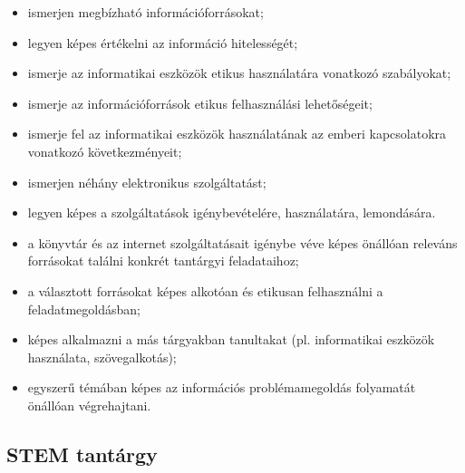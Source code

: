 \begin{itemize}
\item ismerjen megbízható információforrásokat;
\item legyen képes értékelni az információ hitelességét;
\item ismerje az informatikai eszközök etikus használatára vonatkozó szabályokat;
\item ismerje az információforrások etikus felhasználási lehetőségeit;
\item ismerje fel az informatikai eszközök használatának az emberi kapcsolatokra vonatkozó következményeit;
\item ismerjen néhány elektronikus szolgáltatást;
\item legyen képes a szolgáltatások igénybevételére, használatára, lemondására.
\item a könyvtár és az internet szolgáltatásait igénybe véve képes önállóan releváns forrásokat találni konkrét tantárgyi feladataihoz;
\item a választott forrásokat képes alkotóan és etikusan felhasználni a feladatmegoldásban;
\item képes alkalmazni a más tárgyakban tanultakat (pl. informatikai eszközök használata, szövegalkotás);
\item egyszerű témában képes az információs problémamegoldás folyamatát önállóan végrehajtani.
\end{itemize}
\subsection{STEM tantárgy}
